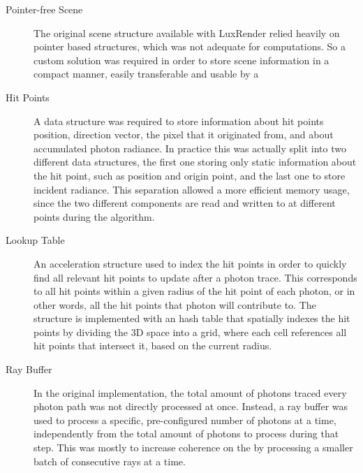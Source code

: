 \documentclass[main.tex]{subfiles}
\begin{document}
\begin{description}
\item[Pointer-free Scene] The original scene structure available with LuxRender relied heavily on pointer based structures, which was not adequate for \gpu computations. So a custom solution was required in order to store scene information in a compact manner, easily transferable and usable by a \gpu

\item[Hit Points] A data structure was required to store information about hit points position, direction vector, the pixel that it originated from, and about accumulated photon radiance. In practice this was actually split into two different data structures, the first one storing only static information about the hit point, such as position and origin point, and the last one to store incident radiance. This separation allowed a more efficient memory usage, since the two different components are read and written to at different points during the algorithm.

\item[Lookup Table] An acceleration structure used to index the hit points in order to quickly find all relevant hit points to update after a photon trace. This corresponds to all hit points within a given radius of the hit point of each photon, or in other words, all the hit points that photon will contribute to. The structure is implemented with an hash table that spatially indexes the hit points by dividing the 3D space into a grid, where each cell references all hit points that intersect it, based on the current radius.

\item[Ray Buffer] In the original implementation, the total amount of photons traced every photon path was not directly processed at once. Instead, a ray buffer was used to process a specific, pre-configured number of photons at a time, independently from the total amount of photons to process during that step. This was mostly to increase coherence on the \cpu by processing a smaller batch of consecutive rays at a time.

\end{description}
\end{document}

